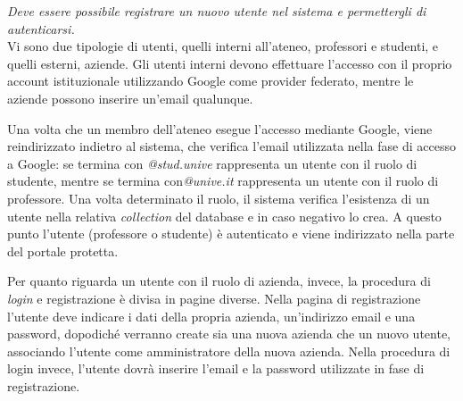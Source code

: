 \textit{Deve essere possibile registrare un nuovo utente nel sistema e permettergli di autenticarsi.} \\

\noindent
Vi sono due tipologie di utenti, quelli interni all'ateneo, professori e studenti, e quelli esterni, aziende. Gli utenti interni devono effettuare l'accesso con il proprio account istituzionale utilizzando Google come provider federato, mentre le aziende possono inserire un'email qualunque. 

Una volta che un membro dell'ateneo esegue l'accesso mediante Google, viene reindirizzato indietro al sistema, che verifica l'email utilizzata nella fase di accesso a Google: se termina con \textit{@stud.unive} rappresenta un utente con il ruolo di studente, mentre se termina con\textit{@unive.it} rappresenta un utente con il ruolo di professore. Una volta determinato il ruolo, il sistema verifica l'esistenza di un utente nella relativa \textit{collection} del database e in caso negativo lo crea. A questo punto l'utente (professore o studente) è autenticato e viene indirizzato nella parte del portale protetta.

Per quanto riguarda un utente con il ruolo di azienda, invece, la procedura di \textit{login} e registrazione è divisa in pagine diverse. Nella pagina di registrazione l'utente deve indicare i dati della propria azienda, un'indirizzo email e una password, dopodiché verranno create sia una nuova azienda che un nuovo utente, associando l'utente come amministratore della nuova azienda. Nella procedura di login invece, l'utente dovrà inserire l'email e la password utilizzate in fase di registrazione.


